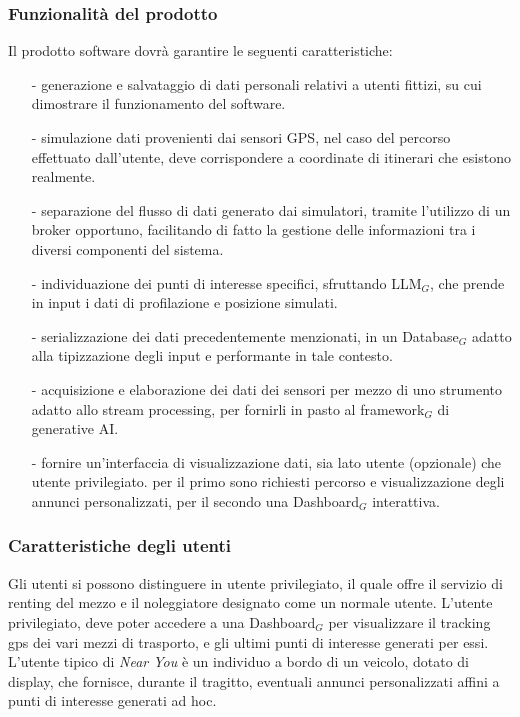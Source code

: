 \documentclass[11pt]{article}
\begin{document}
\begin{justify}
\subsubsection{Funzionalità del prodotto}
Il prodotto software dovrà garantire le seguenti caratteristiche:
\begin{itemize}
    \item [-] generazione e salvataggio di dati personali relativi a utenti fittizi, su cui dimostrare il funzionamento del software.
    \item [-] simulazione dati provenienti dai sensori GPS, nel caso del percorso effettuato dall'utente, deve corrispondere a coordinate di itinerari che esistono realmente.
    \item [-] separazione del flusso di dati generato dai simulatori, tramite l'utilizzo di un broker opportuno, facilitando di fatto la gestione delle informazioni tra i diversi componenti del sistema.
    \item [-] individuazione dei punti di interesse specifici, sfruttando LLM$_G$, che prende in input i dati di profilazione e posizione simulati.
    \item [-] serializzazione dei dati precedentemente menzionati, in un Database$_G$ adatto alla tipizzazione degli input e performante in tale contesto.
    \item [-] acquisizione e elaborazione dei dati dei sensori per mezzo di uno strumento adatto allo stream processing, per fornirli in pasto al framework$_G$ di generative AI.
    \item [-] fornire un'interfaccia di visualizzazione dati, sia lato utente (opzionale) che utente privilegiato. per il primo sono richiesti percorso e visualizzazione degli annunci personalizzati, per il secondo una Dashboard$_G$ interattiva.
\end{itemize}

\subsubsection{Caratteristiche degli utenti}
Gli utenti si possono distinguere in utente privilegiato, il quale offre il servizio di renting del mezzo e il noleggiatore designato come un normale utente. L'utente privilegiato, deve poter accedere a una Dashboard$_G$ per visualizzare il tracking gps dei vari mezzi di trasporto, e gli ultimi punti di interesse generati per essi. L'utente tipico di \textit{Near You} è un individuo a bordo di un veicolo, dotato di display, che fornisce, durante il tragitto, eventuali annunci personalizzati affini a punti di interesse generati ad hoc.


\end{justify}
\end{document}

